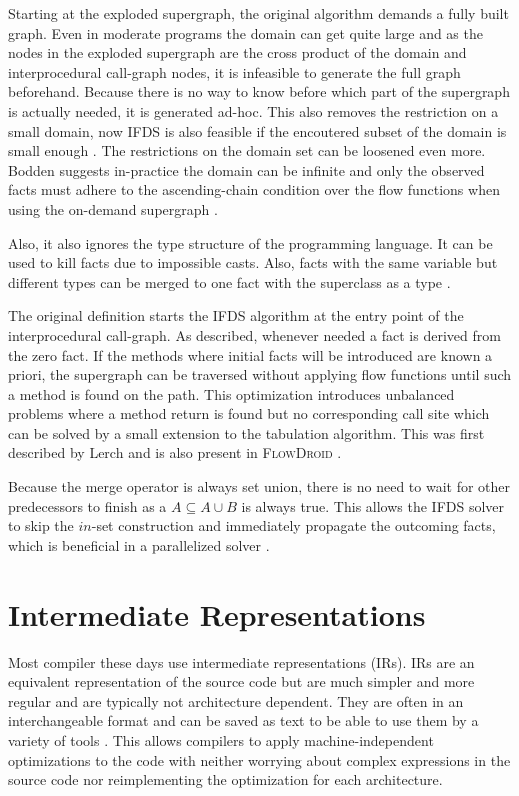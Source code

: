\documentclass[../draft.tex]{subfiles}
\begin{document}
    Starting at the exploded supergraph, the original algorithm demands a fully built graph. Even in moderate programs the domain can get quite large and as the nodes in the exploded supergraph are the cross product of the domain and interprocedural call-graph nodes, it is infeasible to generate the full graph beforehand. Because there is no way to know before which part of the supergraph is actually needed, it is generated ad-hoc. This also removes the restriction on a small domain, now IFDS is also feasible if the encoutered subset of the domain is small enough \cite{Naeem2010}.
    The restrictions on the domain set can be loosened even more. Bodden suggests in-practice the domain can be infinite and only the observed facts must adhere to the ascending-chain condition over the flow functions when using the on-demand supergraph \cite{Bodden2012}.
    
    Also, it also ignores the type structure of the programming language. It can be used to kill facts due to impossible casts. Also, facts with the same variable but different types can be merged to one fact with the superclass as a type \cite{Naeem2010}.

    The original definition starts the IFDS algorithm at the entry point of the interprocedural call-graph. As described, whenever needed a fact is derived from the zero fact. If the methods where initial facts will be introduced are known a priori, the supergraph can be traversed without applying flow functions until such a method is found on the path. This optimization introduces unbalanced problems where a method return is found but no corresponding call site which can be solved by a small extension to the tabulation algorithm. This was first described by Lerch \cite{Lerch2015} and is also present in \textsc{FlowDroid} \cite{Arzt2017PhD}.     

    Because the merge operator is always set union, there is no need to wait for other predecessors to finish as a $A \subseteq A \cup B$ is always true. This allows the IFDS solver to skip the $in$-set construction and immediately propagate the outcoming facts, which is beneficial in a parallelized solver \cite{Arzt2017PhD} .


    \section{Intermediate Representations}\label{s:jimple}
    Most compiler these days use intermediate representations (IRs). IRs are an equivalent representation of the source code but are much simpler and more regular and are typically not architecture dependent. They are often in an interchangeable format and can be saved as text to be able to use them by a variety of tools \cite{Thain2019}.
    This allows compilers to apply machine-independent optimizations to the code with neither worrying about complex expressions in the source code nor reimplementing the optimization for each architecture. 
\end{document}
